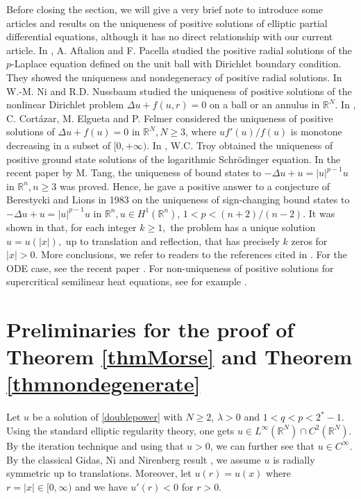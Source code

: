 \documentclass{article}
\theoremstyle{definition} \theoremstyle{remark}
\numberwithin{equation}{section}
\newcommand{\R}{\mathbb{R}}
\newcommand{\la}{\lambda}
\begin{document}
\vskip0.3in

Before closing the section, we  will give a very brief note to introduce some articles and results on the uniqueness of positive solutions of elliptic partial differential equations, although it has no direct relationship with our current article. In \cite{Aftalion2004},  A. Aftalion and  F. Pacella studied  the positive radial solutions of the  $p$-Laplace equation defined on the  unit ball with  Dirichlet boundary condition. They showed
 the uniqueness and nondegeneracy of positive radial solutions.
In \cite{Ni+Nussbaum}  W.-M.  Ni  and R.D. Nussbaum studied the  uniqueness of positive solutions of the nonlinear Dirichlet problem
$\Delta u + f(u, r) = 0$ on  a ball or an annulus in $\R^N$.  In \cite{Cortazar}, C. Cort\'azar,  M. Elgueta and P. Felmer considered the uniqueness of positive solutions of $\Delta u+f(u)=0$  in $\R^N, N\geq 3$, where $ uf'(u)/f(u)$ is monotone decreasing in a subset of $[0, +\infty)$.
In \cite{Troy2016},  W.C. Troy obtained the uniqueness of positive ground state solutions of the logarithmic Schr\"odinger equation.
In the recent paper \cite{MTang=Inv} by M. Tang, the  uniqueness of bound states to
$-\Delta u +u=|u|^{p-1} u$ in $\R^n, n\geq 3$ was proved. Hence, he gave a positive answer to a conjecture of Berestycki and Lions in 1983 on the
uniqueness of sign-changing bound states to $-\Delta u + u= |u|^{p-1} u $  in $\R^n,  u \in H^1(\R^n)$, $1<p<(n+2)/(n-2). $  It was  shown in \cite{MTang=Inv}   that, for each integer $k \geq  1,$  the problem has a unique solution $u = u(|x|),$    up to translation and reflection, that has precisely $k$ zeros for $|x| > 0.$ More conclusions,
we refer to readers to the references cited in \cite{Aftalion2004,Cortazar, DPG, Ni+Nussbaum,MTang=Inv, Troy2016,Yanagida}. For the ODE case, see the recent paper \cite{Feltrin}.
For non-uniqueness of positive solutions for supercritical semilinear heat equations, see for example \cite{Hisa}.














	\section{Preliminaries for the proof of Theorem \ref{thmMorse} and Theorem \ref{thmnondegenerate}} \label{secpre1}

	Let $u$ be a solution of \eqref{doublepower} with $N \ge 2$, $\la > 0$ and $1 < q < p  < 2^*-1$. Using the standard elliptic regularity theory, one gets $u \in L^\infty(\R^N) \cap C^2(\R^N)$. By the iteration technique and using that $u > 0$, we can further see that $u \in C^\infty$. By the classical Gidas, Ni and Nirenberg result \cite{GNN}, we assume $u$ is radially symmetric up to translations. Moreover, let $u(r) = u(x)$ where $r = |x| \in [0,\infty)$ and we have $u'(r) < 0$ for $r > 0$.
\end{document}
